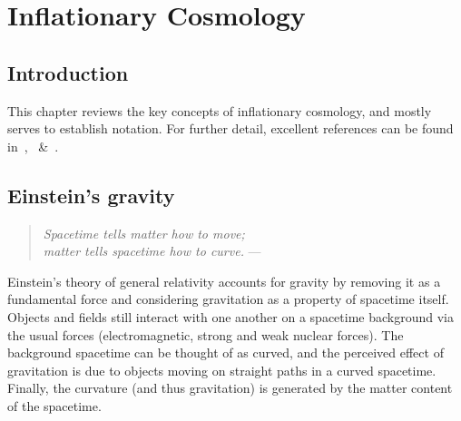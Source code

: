 \chapter{Inflationary Cosmology}
\label{chp:cos}

\section{Introduction}
\label{sec:cos:intro}

This chapter reviews the key concepts of inflationary cosmology, and mostly serves to establish notation.
For further detail, excellent references can be found in~\cite{Wald},~\cite{Hobson} \&~\cite{Dodelson}.

\section{Einstein's gravity}
\label{sec:cos:einsteins_gravity}
\begin{quote}
  {\em Spacetime tells matter how to move;\\ matter tells spacetime how to curve.}\hfill
  --- \johnwheeler{}
\end{quote}

Einstein's theory of general relativity accounts for gravity by removing it as a fundamental force and considering gravitation as a property of spacetime itself. Objects and fields still interact with one another on a spacetime background via the usual forces (electromagnetic, strong and weak nuclear forces). The background spacetime can be thought of as curved, and the perceived effect of gravitation is due to objects moving on straight paths in a curved spacetime. Finally, the curvature (and thus gravitation) is generated by the matter content of the spacetime.

